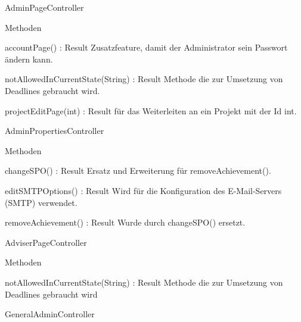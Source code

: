 \documentclass[parskip=full]{scrartcl}
\newcommand{\changeDescription}[1]{{\newline\color{black}\normalfont #1}}
\newcommand{\code}[1]{{\ttfamily #1}}
\begin{document}
\begin{itemPackage}
\begin{itemClass}
\item AdminPageController
\item \begin{itemClassSub}
\item Methoden
\begin{itemPlus}
\item accountPage() : Result \changeDescription{Zusatzfeature, damit der
Administrator sein Passwort ändern kann.}
\item notAllowedInCurrentState(String) : Result \changeDescription{Methode die
zur Umsetzung von Deadlines gebraucht wird.}
\end{itemPlus}
\begin{itemChange}
\item projectEditPage(int) : Result \changeDescription{\code{int} für das
Weiterleiten an ein Projekt mit der Id \code{int}. }
\end{itemChange}
\end{itemClassSub}
\item AdminPropertiesController
\item \begin{itemClassSub}
\item Methoden
\begin{itemPlus}
\item changeSPO() : Result \changeDescription{Ersatz und Erweiterung für
\code{removeAchievement()}. }
\item editSMTPOptions() : Result \changeDescription{Wird für die Konfiguration
des E-Mail-Servers (SMTP) verwendet.}
\end{itemPlus}
\begin{itemMinus}
\item removeAchievement() : Result \changeDescription{Wurde durch
\code{changeSPO()} ersetzt.}
\end{itemMinus}
\end{itemClassSub}
\item AdviserPageController
\item \begin{itemClassSub}
\item Methoden
\begin{itemPlus}
\item notAllowedInCurrentState(String) : Result \changeDescription{Methode die
zur Umsetzung von Deadlines gebraucht wird}
\end{itemPlus}
\end{itemClassSub}
\item GeneralAdminController
\item \begin{itemClassSub}

\end{itemClassSub}
\end{itemClass}
\end{itemPackage}
\end{document}
